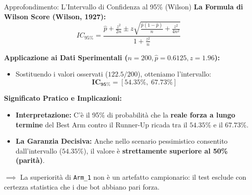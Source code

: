 \documentclass[10pt]{beamer}
\begin{document}
\begin{frame}{Approfondimento: L'Intervallo di Confidenza al 95\% (Wilson)}
    \textbf{La Formula di Wilson Score (Wilson, 1927):}
    $$IC_{95\%} = \frac{\hat{p} + \frac{z^2}{2n} \pm z \sqrt{\frac{\hat{p}(1-\hat{p})}{n} + \frac{z^2}{4n^2}}}{1 + \frac{z^2}{n}}$$
    
    \vspace{0.15cm}
    \textbf{Applicazione ai Dati Sperimentali ($n = 200, \hat{p} = 0.6125, z = 1.96$):}
    \begin{itemize}
        \item Sostituendo i valori osservati ($122.5/200$), otteniamo l'intervallo:
        $$\mathbf{IC_{95\%} = [54.35\%, \; 67.73\%]}$$
    \end{itemize}

    \vspace{0.15cm}
    \textbf{Significato Pratico e Implicazioni:}
    \begin{itemize}
        \item \textbf{Interpretazione:} C'è il 95\% di probabilità che la \textbf{reale forza a lungo termine} del Best Arm contro il Runner-Up ricada tra il $54.35\%$ e il $67.73\%$.
        \item \textbf{La Garanzia Decisiva:} Anche nello scenario pessimistico consentito dall'intervallo ($54.35\%$), il valore è \textbf{strettamente superiore al 50\% (parità)}.
    \end{itemize}
    
    \vspace{0.1cm}
    \footnotesize
    $\implies$ La superiorità di \texttt{Arm\_1} non è un artefatto campionario: il test esclude con certezza statistica che i due bot abbiano pari forza.
\end{frame}
\end{document}
